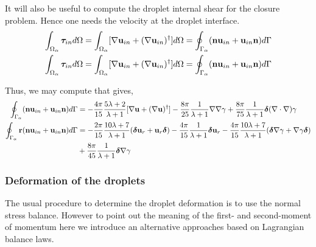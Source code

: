 It will also be useful to compute the droplet internal shear for the closure problem. 
Hence one needs the velocity at the droplet interface. 
\begin{align}
    \int_{\Omega_{\alpha}} \bm\tau_{in} d\Omega
    =
    \int_{\Omega_{\alpha}} [
        \mathbf{\nabla} \textbf{u}_{in} 
        + 
        (\mathbf{\nabla} \textbf{u}_{in})^\dagger
    ] d\Omega
    =
    \oint_{\Gamma_{\alpha}} (\textbf{n} \textbf{u}_{in} + \textbf{u}_{in} \textbf{n}) d\Gamma\\
    \int_{\Omega_{\alpha}} \bm\tau_{in} d\Omega
    =
    \int_{\Omega_{\alpha}} [
        \mathbf{\nabla} \textbf{u}_{in} 
        + 
        (\mathbf{\nabla} \textbf{u}_{in})^\dagger
    ] d\Omega
    =
    \oint_{\Gamma_{\alpha}} (\textbf{n} \textbf{u}_{in} + \textbf{u}_{in} \textbf{n}) d\Gamma
\end{align}

Thus, we may compute that gives,
\begin{align*}
    \oint_{\Gamma_{\alpha}} (\textbf{n} \textbf{u}_{in} + \textbf{u}_{in} \textbf{n}) d\Gamma
    &=
    -\frac{4\pi}{15}\frac{5\lambda +2}{\lambda+1}
    [\mathbf{\nabla} \textbf{u}+ (\mathbf{\nabla} \textbf{u})^\dagger]
    - \frac{8\pi}{25}\frac{1}{\lambda+1}
    \mathbf{\nabla}\mathbf{\nabla} \gamma
    + \frac{8\pi}{75}\frac{1}{\lambda+1}
    \bm\delta(\mathbf{\nabla}\cdot\mathbf{\nabla}) \gamma\\
    \oint_{\Gamma_{\alpha}} \textbf{r}(\textbf{n} \textbf{u}_{in} + \textbf{u}_{in} \textbf{n}) d\Gamma
    &=
    -\frac{2\pi}{15}\frac{10\lambda +7}{\lambda+1}
    (\bm\delta \textbf{u}_r + \textbf{u}_r \bm\delta)
    -\frac{4\pi}{15}\frac{1}{\lambda+1}\bm\delta \textbf{u}_r
    -\frac{4\pi}{15}\frac{10\lambda +7}{\lambda+1}
    (\bm\delta \mathbf{\nabla} \gamma + \mathbf{\nabla} \gamma \bm\delta)\\
    &+\frac{8\pi}{45}\frac{1}{\lambda+1}
    \bm\delta \mathbf{\nabla} \gamma
\end{align*}

\subsubsection*{Deformation of the droplets}
The usual procedure to determine the droplet deformation is to use the normal stress balance. 
However to point out the meaning of the first- and second-moment of momentum here we introduce an alternative approaches based on Lagrangian balance laws. 

